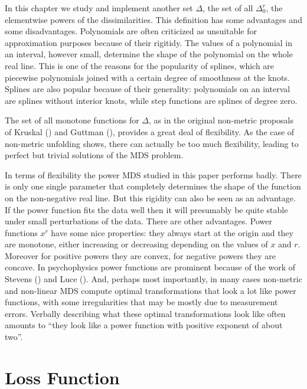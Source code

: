 \documentclass[
  12pt,
  letterpaper,
  DIV=11,
  numbers=noendperiod]{scrartcl}
\begin{document}
In this chapter we study and implement another set \(\Delta\), the set
of all \(\Delta_0^r\), the elementwise powers of the dissimilarities.
This definition has some advantages and some disadvantages. Polynomials
are often criticized as unsuitable for approximation purposes because of
their rigitidy. The values of a polynomial in an interval, however
small, determine the shape of the polynomial on the whole real line.
This is one of the reasons for the popularity of splines, which are
piecewise polynomials joined with a certain degree of smoothness at the
knots. Splines are also popular because of their generality: polynomials
on an interval are splines without interior knots, while step functions
are splines of degree zero.

The set of all monotone functions for \(\Delta\), as in the original
non-metric proposals of Kruskal () and
Guttman (), provides a great deal of
flexibility. As the case of non-metric unfolding shows, there can
actually be too much flexibility, leading to perfect but trivial
solutions of the MDS problem.

In terms of flexibility the power MDS studied in this paper performs
badly. There is only one single parameter that completely determines the
shape of the function on the non-negative real line. But this rigidity
can also be seen as an advantage. If the power function fits the data
well then it will presumably be quite stable under small perturbations
of the data. There are other advantages. Power functions \(x^r\) have
some nice properties: they always start at the origin and they are
monotone, either increasing or decreasing depending on the values of
\(x\) and \(r\). Moreover for positive powers they are convex, for
negative powers they are concave. In psychophysics power functions are
prominent because of the work of Stevens
() and Luce
(). And, perhaps most importantly, in many
cases non-metric and non-linear MDS compute optimal transformations that
look a lot like power functions, with some irregularities that may be
mostly due to measurement errors. Verbally describing what these optimal
transformations look like often amounts to ``they look like a power
function with positive exponent of about two''.

\section{Loss Function}\label{loss-function}
\end{document}
